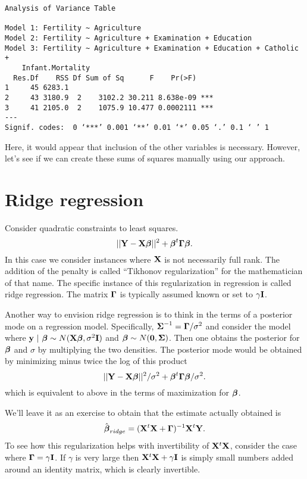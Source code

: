 \begin{verbatim}
Analysis of Variance Table

Model 1: Fertility ~ Agriculture
Model 2: Fertility ~ Agriculture + Examination + Education
Model 3: Fertility ~ Agriculture + Examination + Education + Catholic + 
    Infant.Mortality
  Res.Df    RSS Df Sum of Sq      F    Pr(>F)    
1     45 6283.1                                  
2     43 3180.9  2    3102.2 30.211 8.638e-09 ***
3     41 2105.0  2    1075.9 10.477 0.0002111 ***
---
Signif. codes:  0 ‘***’ 0.001 ‘**’ 0.01 ‘*’ 0.05 ‘.’ 0.1 ‘ ’ 1
\end{verbatim}

Here, it would appear that inclusion of the other variables is necessary.
However, let's see if we can create these sums of squares manually using our
approach.




\section{Ridge regression}

Consider quadratic constraints to least squares.
$$
||\mathbf{Y} - \mathbf{X} \boldsymbol{\beta}||^2 + \boldsymbol{\beta}^t \boldsymbol{\Gamma} \boldsymbol{\beta}.
$$
In this case we consider instances where $\mathbf{X}$ is not necessarily full rank. The
addition of the penalty is called ``Tikhonov regularization'' for the mathematician of
that name. The specific instance of this regularization in regression is called ridge
regression. The matrix $\boldsymbol{\Gamma}$ is typically assumed known or set to $\gamma \mathbf{I}$. 

Another way to envision ridge regression is to think in the terms of a posterior mode 
on a regression model. Specifically, $\boldsymbol{\Sigma}^{-1} = \boldsymbol{\Gamma} / \sigma^2$ and consider the model
where $\mathbf{y} ~|~ \boldsymbol{\beta} \sim N(\mathbf{X} \boldsymbol{\beta}, \sigma^2 \mathbf{I})$ and $\boldsymbol{\beta} \sim N(\mathbf{0}, \boldsymbol{\Sigma})$. 
Then one obtains the posterior for $\boldsymbol{\beta}$ and $\sigma$ by multiplying the two densities. The
posterior mode would be obtained by minimizing minus twice the log of this product
$$
||\mathbf{Y} - \mathbf{X} \boldsymbol{\beta}||^2 / \sigma^2 + \boldsymbol{\beta}^t \boldsymbol{\Gamma} \boldsymbol{\beta} / \sigma^2.
$$
which is equivalent to above in the terms of maximization for $\boldsymbol{\beta}$.

We'll leave it as an exercise to obtain that the estimate actually obtained is
$$
\hat {\boldsymbol{\beta}}_{ridge} = (\mathbf{X}^t \mathbf{X} + \boldsymbol{\Gamma})^{-1} \mathbf{X}^t \mathbf{Y}.
$$
To see how this regularization helps with invertibility of $\mathbf{X}^t \mathbf{X}$, consider the case where
$\boldsymbol{\Gamma} = \gamma \mathbf{I}$. If $\gamma$ is very large then $\mathbf{X}^t \mathbf{X} + \gamma \mathbf{I}$ is simply
small numbers added around an identity matrix, which is clearly invertible. 

